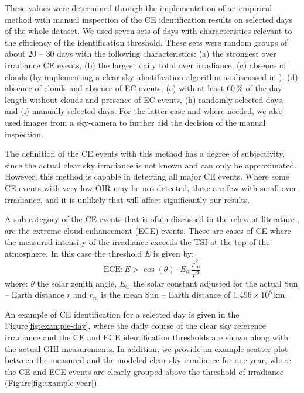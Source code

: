 \documentclass[preprint, 5p,
authoryear]{elsarticle} %
\begin{document}
These values were determined through the implementation of an empirical
method with manual inspection of the CE identification results on
selected days of the whole dataset. We used seven sets of days with
characteristics relevant to the efficiency of the identification
threshold. These sets were random groups of about 20 -- 30 days with the
following characteristics: (a) the strongest over irradiance CE events,
(b) the largest daily total over irradiance, (c) absence of clouds (by
implementing a clear sky identification algorithm as discussed in
\citet{Natsis2023}), (d) absence of clouds and absence of EC events, (e)
with at least \(60\,\%\) of the day length without clouds and presence
of EC events, (h) randomly selected days, and (i) manually selected
days. For the latter case and where needed, we also used images from a
sky-camera to further aid the decision of the manual inspection.

The definition of the CE events with this method has a degree of
subjectivity, since the actual clear sky irradiance is not known and can
only be approximated. However, this method is capable in detecting all
major CE events. Where some CE events with very low OIR may be not
detected, these are few with small over-irradiance, and it is unlikely
that will affect significantly our results.

A sub-category of the CE events that is often discussed in the relevant
literature \citep{Cordero2023, Martins2022, Yordanov2015}, are the
extreme cloud enhancement (ECE) events. These are cases of CE where the
measured intensity of the irradiance exceeds the TSI at the top of the
atmosphere. In this case the threshold \(E\) is given by:
\begin{equation}
\text{ECE}: E > \cos(\theta) \cdot E_{\odot} \frac{r^2_\text{m}} {r^2}
\label{eq:ECE}
\end{equation} where: \(\theta\) the solar zenith angle, \(E_{\odot}\)
the solar constant adjusted for the actual Sun -- Earth distance \(r\)
and \(r_\text{m}\) is the mean Sun -- Earth distance of
\(1.496\times10^8\,\text{km}\).

An example of CE identification for a selected day is given in the
Figure\nobreakspace{}\ref{fig:example-day}, where the daily course of
the clear sky reference irradiance and the CE and ECE identification
thresholds are shown along with the actual GHI measurements. In
addition, we provide an example scatter plot between the measured and
the modeled clear-sky irradiance for one year, where the CE and ECE
events are clearly grouped above the threshold of irradiance
(Figure\nobreakspace{}\ref{fig:example-year}).
\end{document}
